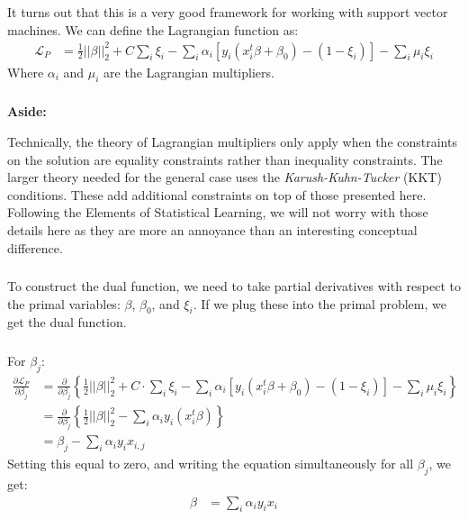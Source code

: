 \documentclass[xetex,mathserif,serif,aspectratio=169]{beamer}
\begin{document}
\begin{frame}[fragile] \frametitle{} \oldB \small

It turns out that this is a very good framework for working with
support vector machines. We can define the Lagrangian function as:
\begin{align*}
\mathcal{L}_P &= \frac{1}{2} || \beta ||_2^2 + C \sum_i \xi_i
  - \sum_i \alpha_i \left[ y_i (x_i^t \beta + \beta_0) - (1 - \xi_i) \right]
  - \sum_i \mu_i \xi_i
\end{align*}
Where $\alpha_i$ and $\mu_i$ are the Lagrangian multipliers.

\end{frame}

\begin{frame}[fragile] \frametitle{} \oldB \small

\textbf{Aside:}

Technically, the theory of Lagrangian multipliers only apply when the
constraints on the solution are equality constraints rather than
inequality constraints. The larger theory needed for the general case
uses the \textit{Karush-Kuhn-Tucker} (KKT) conditions. These add
additional constraints on top of those presented here. Following
the Elements of Statistical Learning, we will not worry with those
details here as they are more an annoyance than an interesting
conceptual difference.

\end{frame}

\begin{frame}[fragile] \frametitle{} \oldB \small

To construct the dual function, we need to take partial derivatives with
respect to the primal variables: $\beta$, $\beta_0$, and $\xi_i$. If we
plug these into the primal problem, we get the dual function.

\end{frame}

\begin{frame}[fragile] \frametitle{} \oldB \small

For $\beta_j$:
\begin{align*}
\frac{\partial\mathcal{L}_P}{\partial \beta_j} &= \frac{\partial}{\partial \beta_j}
\left\{\frac{1}{2} || \beta ||_2^2 + C \cdot \sum_i \xi_i
  - \sum_i \alpha_i \left[ y_i (x_i^t \beta + \beta_0) - (1 - \xi_i) \right]
  - \sum_i \mu_i \xi_i \right\} \\
  &= \frac{\partial}{\partial \beta_j} \left\{\frac{1}{2} || \beta ||_2^2
  - \sum_i \alpha_i y_i (x_i^t \beta) \right\} \\
  &= \beta_j - \sum_i \alpha_i y_i x_{i,j}
\end{align*}
\pause Setting this equal to zero, and writing the equation simultaneously for all $\beta_j$,
we get:
\begin{align*}
\beta &= \sum_i \alpha_i y_i x_i
\end{align*}

\end{frame}
\end{document}
